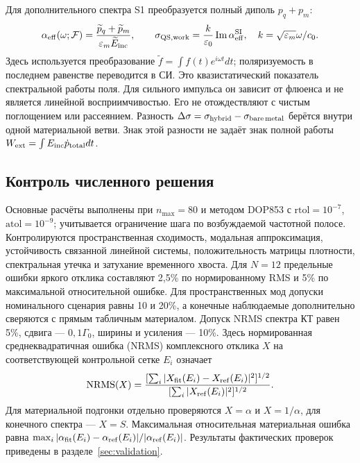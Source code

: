 Для дополнительного спектра S1 преобразуется полный диполь $p_q+p_m$:
\begin{equation}
\alpha_{\rm eff}(\omega;\mathcal F)=
\frac{\widetilde p_q+\widetilde p_m}{\varepsilon_m\widetilde E_{\rm inc}},
\qquad
\sigma_{\rm QS,work}=\frac{k}{\varepsilon_0}
\operatorname{Im}\alpha_{\rm eff}^{\rm SI},\quad
k=\sqrt{\varepsilon_m}\omega/c_0.\label{eq:work}
\end{equation}
Здесь используется преобразование $\widetilde f=\int f(t)e^{i\omega t}dt$;
поляризуемость в последнем равенстве переводится в СИ.
Это квазистатический показатель спектральной работы поля. Для сильного
импульса он зависит от флюенса и не является линейной восприимчивостью.
Его не отождествляют с чистым поглощением или рассеянием.
Разность $\Delta\sigma=\sigma_{\rm hybrid}-\sigma_{\rm bare\,metal}$
берётся внутри одной материальной ветви. Знак этой разности не задаёт
знак полной работы $W_{\rm ext}=\int E_{\rm inc}\dot p_{\rm total}dt$.

\subsection{Контроль численного решения}
Основные расчёты выполнены при $n_{\max}=80$ и методом DOP853 с
$\mathrm{rtol}=10^{-7}$, $\mathrm{atol}=10^{-9}$; учитывается ограничение
шага по возбуждаемой частотной полосе. Контролируются пространственная
сходимость, модальная аппроксимация, устойчивость связанной линейной
системы, положительность матрицы плотности, спектральная утечка и
затухание временного хвоста. Для $N=12$ предельные ошибки яркого отклика
составляют 2,5\% по нормированному RMS и 5\% по максимальной
относительной ошибке. Для пространственных мод допуски номинального
сценария равны 10 и 20\%, а конечные наблюдаемые дополнительно сверяются
с прямым табличным материалом. Допуск NRMS спектра КТ равен 5\%,
сдвига --- $0{,}1\Gamma_0$, ширины и усиления --- 10\%.
Здесь нормированная среднеквадратичная ошибка (NRMS) комплексного
отклика $X$ на соответствующей контрольной сетке $E_i$ означает
\begin{equation}
\mathrm{NRMS}(X)=
\frac{[\sum_i|X_{\rm fit}(E_i)-X_{\rm ref}(E_i)|^2]^{1/2}}
{[\sum_i|X_{\rm ref}(E_i)|^2]^{1/2}}.
\end{equation}
Для материальной подгонки отдельно проверяются $X=\alpha$ и
$X=1/\alpha$, для конечного спектра --- $X=S$.
Максимальная относительная материальная ошибка равна
$\max_i|\alpha_{\rm fit}(E_i)-\alpha_{\rm ref}(E_i)|/
|\alpha_{\rm ref}(E_i)|$.
Результаты фактических проверок приведены в разделе~\ref{sec:validation}.
